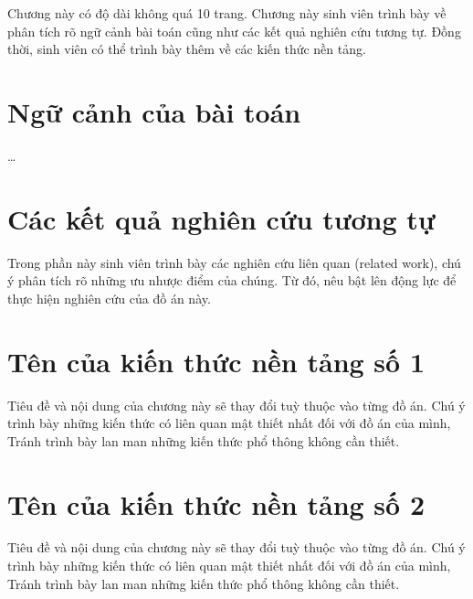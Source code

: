 \documentclass[../DoAn.tex]{subfiles}
\begin{document}
Chương này có độ dài không quá 10 trang. Chương này sinh viên trình bày về phân tích rõ ngữ cảnh bài toán cũng như các kết quả nghiên cứu tương tự. Đồng thời, sinh viên có thể trình bày thêm về các kiến thức nền tảng.

\section{Ngữ cảnh của bài toán}
\ldots

\section{Các kết quả nghiên cứu tương tự}
Trong phần này sinh viên trình bày các nghiên cứu liên quan (related work), chú ý phân tích rõ những ưu nhược điểm của chúng. Từ đó, nêu bật lên động lực để thực hiện nghiên cứu của đồ án này.


\section{Tên của kiến thức nền tảng số 1}
Tiêu đề và nội dung của chương này sẽ thay đổi tuỳ thuộc vào từng đồ án. Chú ý trình bày những kiến thức có liên quan mật thiết nhất đối với đồ án của mình, Tránh trình bày lan man những kiến thức phổ thông không cần thiết. 

\section{Tên của kiến thức nền tảng số 2}
Tiêu đề và nội dung của chương này sẽ thay đổi tuỳ thuộc vào từng đồ án. Chú ý trình bày những kiến thức có liên quan mật thiết nhất đối với đồ án của mình, Tránh trình bày lan man những kiến thức phổ thông không cần thiết. 
\end{document}
